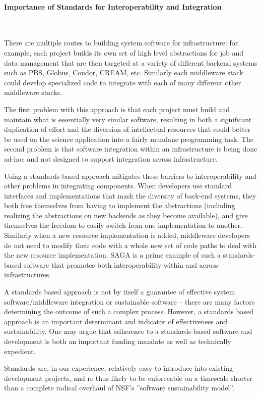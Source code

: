 \documentclass[a4paper,12pt]{article}
\begin{document}
\paragraph{Importance of Standards for Interoperability and
    Integration}~

There are multiple routes to building system software for
infrastructure: for example, each project builds its own set of high
level abstractions for job and data management that are then targeted
at a variety of different backend systems such as PBS, Globus, Condor,
CREAM, etc. Similarly each middleware stack could develop specialized
code to integrate with each of many different other middleware stacks.

The first problem with this approach is that each project must build
and maintain what is essentially very similar software, resulting in
both a significant duplication of effort and the diversion of
intellectual resources that could better be used on the science
application into a fairly mundane programming task.  The second
problem is that software integration within an infrastructure is being
done ad-hoc and not designed to support integration across
infrastructure.

Using a standards-based approach mitigates these barriers to
interoperability and other problems in integrating components. When
developers use standard interfaces and implementations that mask the
diversity of back-end systems, they both free themselves from having
to implement the abstractions (including realizing the abstractions on
new backends as they become available), and give themselves the
freedom to easily switch from one implementation to another. Similarly
when a new resource implementation is added, middleware developers do
not need to modify their code with a whole new set of code paths to
deal with the new resource implementation.  SAGA is a prime example of
such a standards-based software that promotes both interoperability
within and across infrastructures.

A standards based approach is not by itself a guarantee of effective
system software/middleware integration or sustainable software --
there are many factors determining the outcome of such a complex
process. However, a standards based approach is an important
determinant and indicator of effectiveness and sustainability.  One
may argue that adherence to a standards-based software and development
is both an important funding mandate as well as technically expedient.  

Standards are, in our experience, relatively easy to introduce into
 existing development projects, and re thus likely to be enforceable
 on a timescale shorter than a complete radical overhaul of NSF’s
 ''software sustainability model''.
\end{document}
